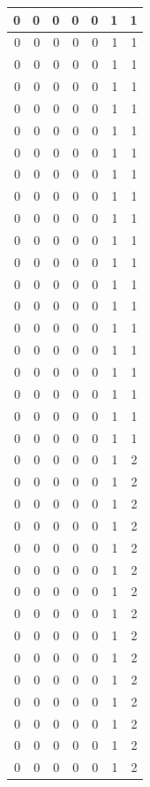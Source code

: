 \documentclass[
  12pt,
]{krantz}
\begin{document}
\begin{tabular}{r|r|r|r|r|r|r}
\hline
0 & 0 & 0 & 0 & 0 & 1 & 1\\
\hline
0 & 0 & 0 & 0 & 0 & 1 & 1\\
\hline
0 & 0 & 0 & 0 & 0 & 1 & 1\\
\hline
0 & 0 & 0 & 0 & 0 & 1 & 1\\
\hline
0 & 0 & 0 & 0 & 0 & 1 & 1\\
\hline
0 & 0 & 0 & 0 & 0 & 1 & 1\\
\hline
0 & 0 & 0 & 0 & 0 & 1 & 1\\
\hline
0 & 0 & 0 & 0 & 0 & 1 & 1\\
\hline
0 & 0 & 0 & 0 & 0 & 1 & 1\\
\hline
0 & 0 & 0 & 0 & 0 & 1 & 1\\
\hline
0 & 0 & 0 & 0 & 0 & 1 & 1\\
\hline
0 & 0 & 0 & 0 & 0 & 1 & 1\\
\hline
0 & 0 & 0 & 0 & 0 & 1 & 1\\
\hline
0 & 0 & 0 & 0 & 0 & 1 & 1\\
\hline
0 & 0 & 0 & 0 & 0 & 1 & 1\\
\hline
0 & 0 & 0 & 0 & 0 & 1 & 1\\
\hline
0 & 0 & 0 & 0 & 0 & 1 & 1\\
\hline
0 & 0 & 0 & 0 & 0 & 1 & 1\\
\hline
0 & 0 & 0 & 0 & 0 & 1 & 1\\
\hline
0 & 0 & 0 & 0 & 0 & 1 & 1\\
\hline
0 & 0 & 0 & 0 & 0 & 1 & 2\\
\hline
0 & 0 & 0 & 0 & 0 & 1 & 2\\
\hline
0 & 0 & 0 & 0 & 0 & 1 & 2\\
\hline
0 & 0 & 0 & 0 & 0 & 1 & 2\\
\hline
0 & 0 & 0 & 0 & 0 & 1 & 2\\
\hline
0 & 0 & 0 & 0 & 0 & 1 & 2\\
\hline
0 & 0 & 0 & 0 & 0 & 1 & 2\\
\hline
0 & 0 & 0 & 0 & 0 & 1 & 2\\
\hline
0 & 0 & 0 & 0 & 0 & 1 & 2\\
\hline
0 & 0 & 0 & 0 & 0 & 1 & 2\\
\hline
0 & 0 & 0 & 0 & 0 & 1 & 2\\
\hline
0 & 0 & 0 & 0 & 0 & 1 & 2\\
\hline
0 & 0 & 0 & 0 & 0 & 1 & 2\\
\hline
0 & 0 & 0 & 0 & 0 & 1 & 2\\
\hline
0 & 0 & 0 & 0 & 0 & 1 & 2\\

\end{tabular}
\end{document}
